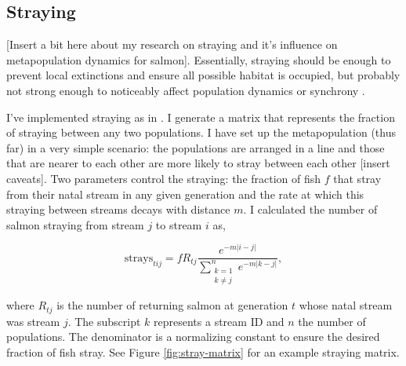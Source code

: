 \documentclass[12pt]{article}
\begin{document}
\subsection{Straying}

{[}Insert a bit here about my research on straying and it's influence on
metapopulation dynamics for salmon{]}. Essentially, straying should be
enough to prevent local extinctions and ensure all possible habitat is
occupied, but probably not strong enough to noticeably affect population
dynamics or synchrony \citep{Schtickzelle2007}.

I've implemented straying as in \citet{Cooper1999}. I generate a matrix
that represents the fraction of straying between any two populations. I
have set up the metapopulation (thus far) in a very simple scenario: the
populations are arranged in a line and those that are nearer to each
other are more likely to stray between each other {[}insert caveats{]}.
Two parameters control the straying: the fraction of fish $f$ that stray
from their natal stream in any given generation and the rate at which
this straying between streams decays with distance $m$. I calculated the
number of salmon straying from stream $j$ to stream $i$ as,

\begin{equation}
  \mathrm{strays}_{tij} = f R_{tj} \frac{e^{-m \lvert i-j \rvert }}{\displaystyle\sum\limits_{\substack{k = 1 \\
  k \neq j}}^{n} e^{-m \lvert k-j \rvert }},
\end{equation}

\noindent
where $R_{tj}$ is the number of returning salmon at generation $t$ whose
natal stream was stream $j$. The subscript $k$ represents a stream ID
and $n$ the number of populations. The denominator is a normalizing
constant to ensure the desired fraction of fish stray. See Figure
\ref{fig:stray-matrix} for an example straying matrix.
\end{document}

